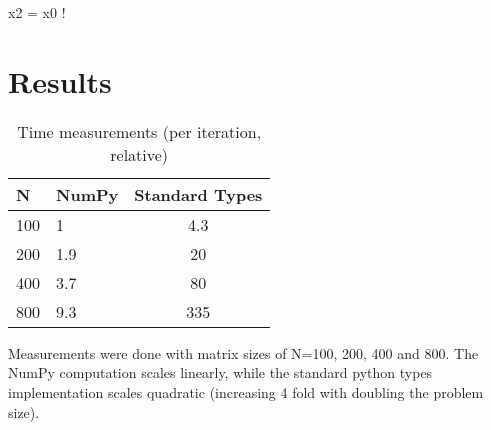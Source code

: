 \documentclass[11pt]{amsart}
\begin{document}
x2 = x0 !

\section{Results}

%
%
%


% 
% 



%
%
%



%


\begin{table}[!hbp]
\begin{tabular}{llc}
\hline
N &  NumPy &  Standard Types \\ 
\hline
100 &  1 &    4.3         \\
200 &  1.9  &   20            \\
400 & 3.7   &   80            \\
800 &  9.3  &    335         \\
\hline
\end{tabular}
\caption{Time measurements (per iteration, relative)}
\end{table}

Measurements were done with matrix sizes of N=100, 200, 400 and 800. 
The NumPy computation scales linearly, while the standard python types implementation scales quadratic (increasing 4 fold with doubling the problem size).
\end{document}
